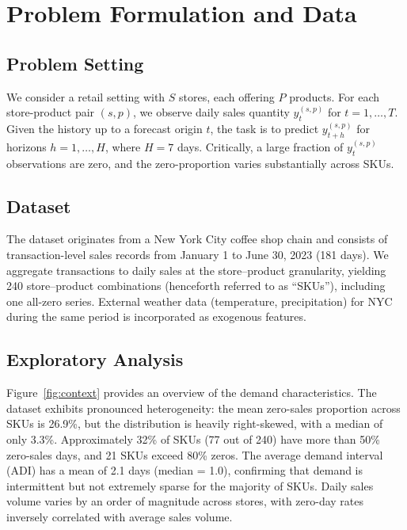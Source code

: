 \documentclass[review,authoryear]{elsarticle}
\begin{document}
\section{Problem Formulation and Data}

\subsection{Problem Setting}

We consider a retail setting with $S$ stores, each offering $P$ products. For each store-product pair $(s,p)$, we observe daily sales quantity $y_{t}^{(s,p)}$ for $t = 1, \ldots, T$. Given the history up to a forecast origin $t$, the task is to predict $y_{t+h}^{(s,p)}$ for horizons $h = 1, \ldots, H$, where $H = 7$ days. Critically, a large fraction of $y_{t}^{(s,p)}$ observations are zero, and the zero-proportion varies substantially across SKUs.

\subsection{Dataset}

The dataset originates from a New York City coffee shop chain and consists of transaction-level sales records from January 1 to June 30, 2023 (181 days). We aggregate transactions to daily sales at the store--product granularity, yielding 240 store--product combinations (henceforth referred to as ``SKUs''), including one all-zero series. External weather data (temperature, precipitation) for NYC during the same period is incorporated as exogenous features.

\subsection{Exploratory Analysis}

Figure~\ref{fig:context} provides an overview of the demand characteristics. The dataset exhibits pronounced heterogeneity: the mean zero-sales proportion across SKUs is 26.9\%, but the distribution is heavily right-skewed, with a median of only 3.3\%. Approximately 32\% of SKUs (77 out of 240) have more than 50\% zero-sales days, and 21 SKUs exceed 80\% zeros. The average demand interval (ADI) has a mean of 2.1 days (median = 1.0), confirming that demand is intermittent but not extremely sparse for the majority of SKUs. Daily sales volume varies by an order of magnitude across stores, with zero-day rates inversely correlated with average sales volume.
\end{document}
